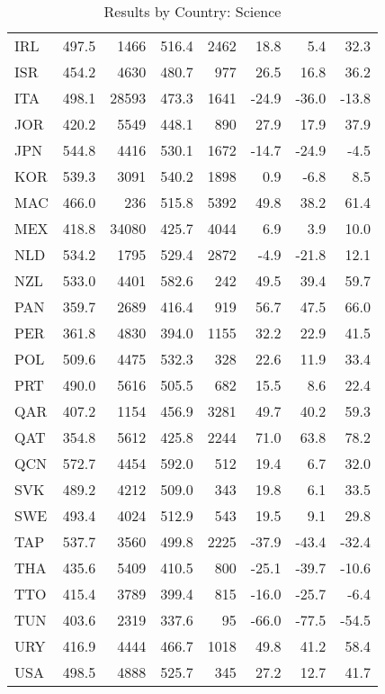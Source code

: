 \begin{table}[ht]
\begin{center}
{\begin{tabular}{lrr@{\extracolsep{10pt}}rr@{\extracolsep{10pt}}rrr}
  IRL & 497.5 & 1466 & 516.4 & 2462 & 18.8 & 5.4 & 32.3 \\ 
  ISR & 454.2 & 4630 & 480.7 & 977 & 26.5 & 16.8 & 36.2 \\ 
  ITA & 498.1 & 28593 & 473.3 & 1641 & -24.9 & -36.0 & -13.8 \\ 
  JOR & 420.2 & 5549 & 448.1 & 890 & 27.9 & 17.9 & 37.9 \\ 
  JPN & 544.8 & 4416 & 530.1 & 1672 & -14.7 & -24.9 & -4.5 \\ 
  KOR & 539.3 & 3091 & 540.2 & 1898 & 0.9 & -6.8 & 8.5 \\ 
  MAC & 466.0 & 236 & 515.8 & 5392 & 49.8 & 38.2 & 61.4 \\ 
  MEX & 418.8 & 34080 & 425.7 & 4044 & 6.9 & 3.9 & 10.0 \\ 
  NLD & 534.2 & 1795 & 529.4 & 2872 & -4.9 & -21.8 & 12.1 \\ 
  NZL & 533.0 & 4401 & 582.6 & 242 & 49.5 & 39.4 & 59.7 \\ 
  PAN & 359.7 & 2689 & 416.4 & 919 & 56.7 & 47.5 & 66.0 \\ 
  PER & 361.8 & 4830 & 394.0 & 1155 & 32.2 & 22.9 & 41.5 \\ 
  POL & 509.6 & 4475 & 532.3 & 328 & 22.6 & 11.9 & 33.4 \\ 
  PRT & 490.0 & 5616 & 505.5 & 682 & 15.5 & 8.6 & 22.4 \\ 
  QAR & 407.2 & 1154 & 456.9 & 3281 & 49.7 & 40.2 & 59.3 \\ 
  QAT & 354.8 & 5612 & 425.8 & 2244 & 71.0 & 63.8 & 78.2 \\ 
  QCN & 572.7 & 4454 & 592.0 & 512 & 19.4 & 6.7 & 32.0 \\ 
  SVK & 489.2 & 4212 & 509.0 & 343 & 19.8 & 6.1 & 33.5 \\ 
  SWE & 493.4 & 4024 & 512.9 & 543 & 19.5 & 9.1 & 29.8 \\ 
  TAP & 537.7 & 3560 & 499.8 & 2225 & -37.9 & -43.4 & -32.4 \\ 
  THA & 435.6 & 5409 & 410.5 & 800 & -25.1 & -39.7 & -10.6 \\ 
  TTO & 415.4 & 3789 & 399.4 & 815 & -16.0 & -25.7 & -6.4 \\ 
  TUN & 403.6 & 2319 & 337.6 & 95 & -66.0 & -77.5 & -54.5 \\ 
  URY & 416.9 & 4444 & 466.7 & 1018 & 49.8 & 41.2 & 58.4 \\ 
  USA & 498.5 & 4888 & 525.7 & 345 & 27.2 & 12.7 & 41.7 \\ 
   \hline
\end{tabular}
}
\caption{Results by Country: Science}
\label{level2scie}
\end{center}
\end{table}
